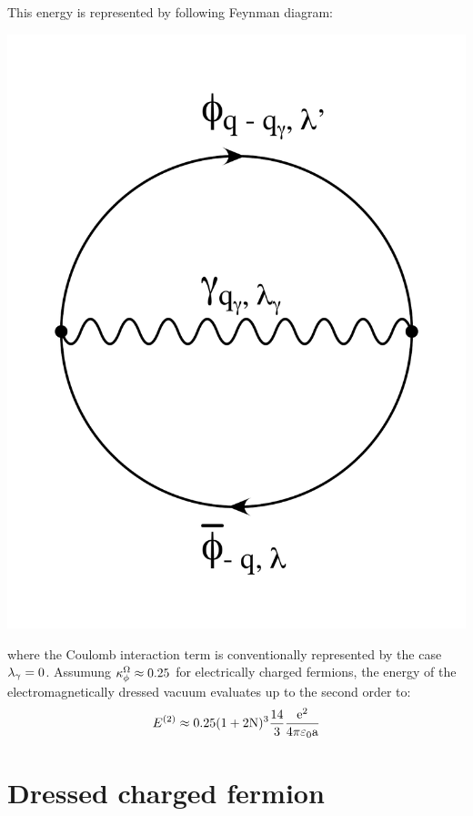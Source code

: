 \documentclass[10pt,a4paper,twoside,openany]{book}
\begin{document}
This energy is represented by following Feynman diagram:
\begin{center}
\includegraphics[scale=0.2]{images/diagrams/Vacuum_Energy_2.pdf}
\end{center}
where the Coulomb interaction term is conventionally  represented by the case $\lambda_\gamma = 0$.
Assumung $\kappa^\Omega_\phi \approx 0.25$ for electrically charged fermions, the energy of the electromagnetically dressed vacuum evaluates up to the second order to:
\begin{equation*}
E^{(2)} \approx 0.25 ( 1 + 2 \mathrm N )^3 \frac {14} 3 \frac{\mathrm e^2}{4 \pi \mathrm \varepsilon_0 \mathrm a}
\end{equation*}

\section{Dressed charged fermion}

\end{document}
